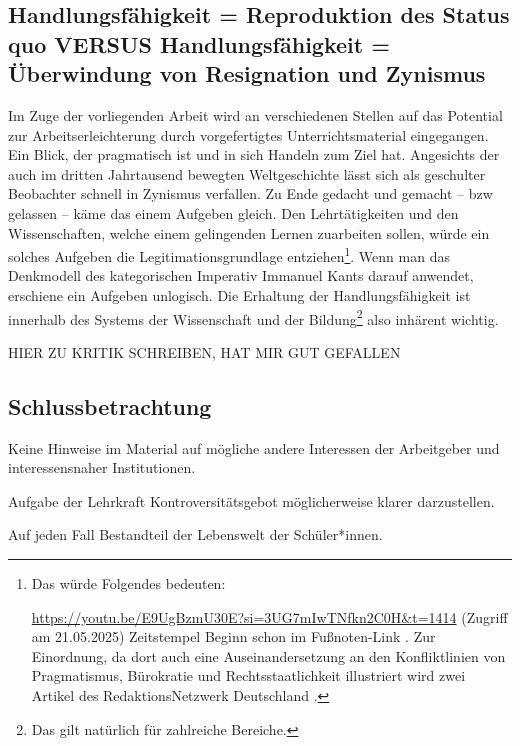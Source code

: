 \subsection{Handlungsfähigkeit = Reproduktion des Status quo VERSUS Handlungsfähigkeit = Überwindung von Resignation und Zynismus}
Im Zuge der vorliegenden Arbeit wird an verschiedenen Stellen auf das Potential zur Arbeitserleichterung durch vorgefertigtes Unterrichtsmaterial eingegangen. Ein Blick, der pragmatisch ist und in sich Handeln zum Ziel hat. Angesichts der auch im dritten Jahrtausend bewegten Weltgeschichte lässt sich als geschulter Beobachter schnell in Zynismus verfallen. Zu Ende gedacht und gemacht -- \gls{bzw} gelassen -- käme das einem Aufgeben gleich. Den Lehrtätigkeiten und den Wissenschaften, welche einem gelingenden Lernen zuarbeiten sollen, würde ein solches Aufgeben die Legitimationsgrundlage entziehen\footnote{
    Das würde Folgendes bedeuten: 

    \url{https://youtu.be/E9UgBzmU30E?si=3UG7mIwTNfkn2C0H&t=1414} (Zugriff am 21.05.2025) Zeitstempel Beginn schon im Fußnoten-Link \autocite[][Als Meme von $23\,^{\prime}34\,^{\prime\prime}$ bis $23\,^{\prime}50\,^{\prime\prime}$ schauen]{Wolle}. Zur Einordnung, da dort auch %
    eine Auseinandersetzung an den Konfliktlinien von Pragmatismus, Bürokratie und Rechtsstaatlichkeit illustriert wird zwei Artikel des RedaktionsNetzwerk Deutschland \autocites{Schwarzer.05.02.2021}{Schwarzer.08.02.2021}.
}. Wenn man das Denkmodell des kategorischen Imperativ Immanuel Kants darauf anwendet, erschiene ein Aufgeben unlogisch. Die Erhaltung der Handlungsfähigkeit ist innerhalb des Systems der Wissenschaft und der Bildung\footnote{
    Das gilt natürlich für zahlreiche Bereiche. 
} also inhärent wichtig. 


HIER ZU  KRITIK SCHREIBEN, HAT MIR GUT GEFALLEN
\autocite[]{Roler2016}

\subsection{Schlussbetrachtung}
Keine Hinweise im Material auf mögliche andere Interessen der Arbeitgeber und interessensnaher Institutionen.

Aufgabe der Lehrkraft Kontroversitätsgebot möglicherweise klarer darzustellen.

Auf jeden Fall Bestandteil der Lebenswelt der Schüler*innen.

